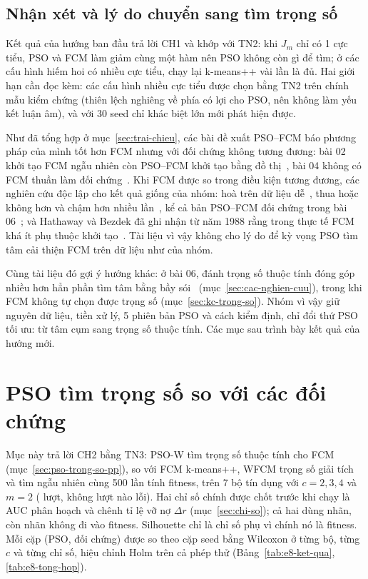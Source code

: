 

\subsection{Nhận xét và lý do chuyển sang tìm trọng số}
\label{sec:chuyen-huong}

Kết quả của hướng ban đầu trả lời CH1 và khớp với TN2: khi $J_m$ chỉ có 1 cực tiểu, PSO và FCM làm giảm cùng một hàm nên PSO
không còn gì để tìm; ở các cấu hình hiếm hoi có nhiều cực tiểu, chạy lại k-means++ vài lần là đủ. Hai giới hạn cần đọc kèm:
các cấu hình nhiều cực tiểu được chọn bằng TN2 trên chính mẫu kiểm chứng (thiên lệch nghiêng về phía có lợi cho PSO, nên không
làm yếu kết luận âm), và với 30 seed chỉ khác biệt lớn mới phát hiện được.

Như đã tổng hợp ở mục~\ref{sec:trai-chieu}, các bài đề xuất PSO--FCM báo phương pháp của mình
tốt hơn FCM nhưng với đối chứng không tương đương: bài 02 khởi tạo FCM ngẫu nhiên còn PSO--FCM khởi tạo bằng đồ
thị~\cite{qian2022psofcm}, bài 04 không có FCM thuần làm đối chứng~\cite{zhang2025qpsofcm}. Khi FCM được so trong điều kiện
tương đương, các nghiên cứu độc lập cho kết quả giống của nhóm: hoà trên dữ liệu dễ~\cite{mehdizadeh2008hybrid}, thua hoặc
không hơn và chậm hơn nhiều lần~\cite{ghamisi2015swarm,omran2004thesis,izakian2009hybrid}, kể cả bản PSO--FCM đối chứng trong
bài 06~\cite{liu2021msgwo}; và Hathaway và Bezdek đã ghi nhận từ năm 1988 rằng trong thực tế FCM khá ít phụ thuộc khởi
tạo~\cite{hathaway1988recent}. Tài liệu vì vậy không cho lý do để kỳ vọng PSO tìm tâm cải thiện FCM trên dữ liệu như của nhóm.

Cùng tài liệu đó gợi ý hướng khác: ở bài 06, đánh trọng số thuộc tính đóng góp nhiều hơn hẳn phần tìm tâm bằng bầy
sói~\cite{liu2021msgwo} (mục~\ref{sec:cac-nghien-cuu}), trong khi FCM không tự chọn được
trọng số (mục~\ref{sec:kc-trong-so}). Nhóm vì vậy giữ nguyên dữ liệu, tiền xử lý, 5 phiên bản PSO và cách kiểm định, chỉ đổi
thứ PSO tối ưu: từ tâm cụm sang trọng số thuộc tính. Các mục sau trình bày kết quả của hướng mới.

\section{PSO tìm trọng số so với các đối chứng}
\label{sec:pso-trong-so}

Mục này trả lời CH2 bằng TN3: PSO-W tìm trọng số thuộc tính cho FCM (mục~\ref{sec:pso-trong-so-pp}), so với FCM k-means++,
WFCM trọng số giải tích và tìm ngẫu nhiên cùng 500 lần tính fitness, trên 7 bộ tín dụng với $c = 2, 3, 4$ và $m = 2$
(\soLieuETamSoLuot{} lượt, không lượt nào lỗi). Hai chỉ số chính được chốt trước khi chạy là AUC phân hoạch và chênh tỉ lệ vỡ
nợ $\Delta r$ (mục~\ref{sec:chi-so}); cả hai dùng nhãn, còn nhãn không đi vào fitness. Silhouette chỉ là chỉ số phụ vì chính
nó là fitness. Mỗi cặp (PSO, đối chứng) được so theo cặp seed bằng Wilcoxon ở từng bộ, từng $c$ và từng chỉ số, hiệu chỉnh
Holm trên cả \soLieuETamSoPhep{} phép thử (Bảng~\ref{tab:e8-ket-qua}, \ref{tab:e8-tong-hop}).

